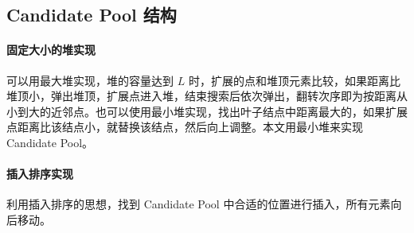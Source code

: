 \documentclass{article}
\begin{document}
\subsection{Candidate Pool 结构}

\paragraph*{固定大小的堆实现} 可以用最大堆实现，堆的容量达到 $L$ 时，扩展的点和堆顶元素比较，如果距离比堆顶小，弹出堆顶，扩展点进入堆，结束搜索后依次弹出，翻转次序即为按距离从小到大的近邻点。也可以使用最小堆实现，找出叶子结点中距离最大的，如果扩展点距离比该结点小，就替换该结点，然后向上调整。本文用最小堆来实现 Candidate Pool。

\paragraph*{插入排序实现} 利用插入排序的思想，找到 Candidate Pool 中合适的位置进行插入，所有元素向后移动。
\end{document}
